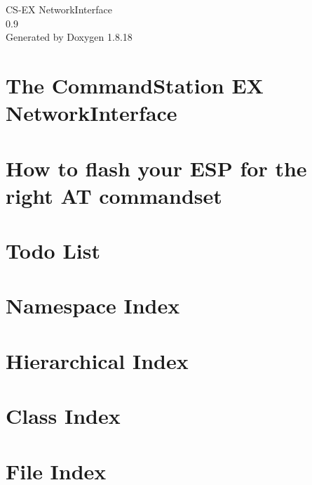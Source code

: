\let\mypdfximage\pdfximage\def\pdfximage{\immediate\mypdfximage}\documentclass[twoside]{book}
\newcommand{\+}{\discretionary{\mbox{\scriptsize$\hookleftarrow$}}{}{}}
\newcommand{\clearemptydoublepage}{%
  \newpage{\pagestyle{empty}\cleardoublepage}%
}
\begin{document}
\hypersetup{pageanchor=false,
             bookmarksnumbered=true,
             pdfencoding=unicode
            }
\begin{titlepage}
\vspace*{7cm}
\begin{center}%
{\Large C\+S-\/\+EX Network\+Interface \\[1ex]\large 0.\+9 }\\
\vspace*{1cm}
{\large Generated by Doxygen 1.8.18}\\
\end{center}
\end{titlepage}
\clearemptydoublepage
{}
\tableofcontents
\clearemptydoublepage
{}
\hypersetup{pageanchor=true}

\chapter{The Command\+Station EX Network\+Interface}
\label{md_src_docs__c_s_network_interface}

\chapter{How to flash your E\+SP for the right AT commandset}
\label{md_src_docs__flash_your__e_s_p_with__a_t_1_87_commandset}

\chapter{Todo List}
\label{todo}

\chapter{Namespace Index}

\chapter{Hierarchical Index}

\chapter{Class Index}

\chapter{File Index}

\end{document}
